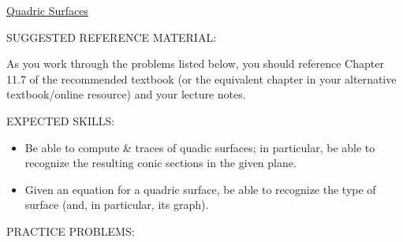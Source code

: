 \documentclass[12pt]{article}
\begin{document}
\begin{center}
\underline{\LARGE{Quadric Surfaces}}
\end{center}

\noindent SUGGESTED REFERENCE MATERIAL:

\bigskip

\noindent As you work through the problems listed below, you should reference Chapter 11.7 of the recommended textbook (or the equivalent chapter in your alternative textbook/online resource) and your lecture notes.

\bigskip

\noindent EXPECTED SKILLS:

\begin{itemize}

\item Be able to compute \& traces of quadic surfaces; in particular, be able to recognize the resulting conic sections in the given plane.

\item Given an equation for a quadric surface, be able to recognize the type of surface (and, in particular, its graph).

\end{itemize}

\noindent PRACTICE PROBLEMS:

\medskip

\end{document}
